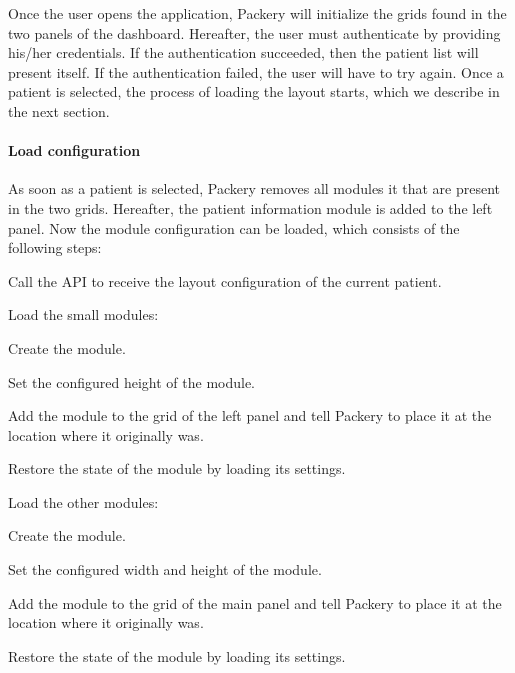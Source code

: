         Once the user opens the application, Packery will initialize the grids found in the two panels of the dashboard. Hereafter, the user must authenticate by providing his/her credentials. If the authentication succeeded, then the patient list will present itself. If the authentication failed, the user will have to try again. Once a patient is selected, the process of loading the layout starts, which we describe in the next section.


            \paragraph{Load configuration} As soon as a patient is selected, Packery removes all modules it that are present in the two grids. Hereafter, the patient information module is added to the left panel. Now the module configuration can be loaded, which consists of the following steps:
            \vspace{-6pt}
            \begin{myenumerate}
                \item Call the API to receive the layout configuration of the current patient.
                \item Load the small modules:
                \begin{myenumerate}
                    \item Create the module.
                    \item Set the configured height of the module.
                    \item Add the module to the grid of the left panel and tell Packery to place it at the location where it originally was.
                    \item Restore the state of the module by loading its settings.
                \end{myenumerate}
                \item Load the other modules:
                \begin{myenumerate}
                    \item Create the module.
                    \item Set the configured width and height of the module.
                    \item Add the module to the grid of the main panel and tell Packery to place it at the location where it originally was.
                    \item Restore the state of the module by loading its settings.
                \end{myenumerate}
            \end{myenumerate}
            
